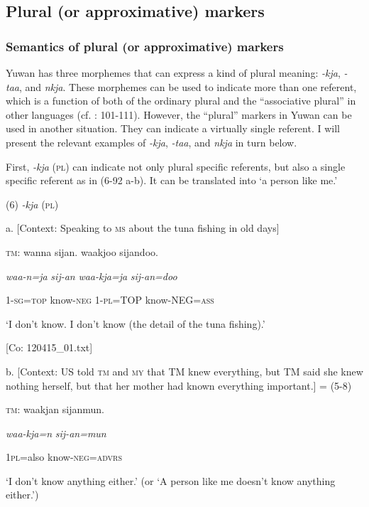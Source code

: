 \subsection{Plural (or approximative) markers}
\subsubsection{Semantics of plural (or approximative) markers}

Yuwan has three morphemes that can express a kind of plural meaning: \textit{-kja}, \textit{{}-taa}, and \textit{nkja}. These morphemes can be used to indicate more than one referent, which is a function of both of the ordinary plural and the “associative plural” in other languages (cf. \citealt{Corbett2000}: 101-111). However, the “plural” markers in Yuwan can be used in another situation. They can indicate a virtually single referent. I will present the relevant examples of \textit{{}-kja}, \textit{{}-taa}, and \textit{nkja} in turn below.

First, \textit{{}-kja} (\textsc{pl}) can indicate not only plural specific referents, but also a single specific referent as in (6-92 a-b). It can be translated into ‘a person like me.’

(6)  \textit{{}-kja} (\textsc{pl})

  a.  [Context: Speaking to \textsc{ms} about the tuna fishing in old days]

    \textsc{tm}:  wanna  sijan.  waakjoo  sijandoo.

      \textit{waa-n=ja}  \textit{sij-an}  \textit{waa-kja=ja}  \textit{sij-an=doo}

      1-\textsc{sg}=\textsc{top}  know-\textsc{neg}  1-\textsc{pl}=TOP  know-NEG=\textsc{ass}

      ‘I don’t know. I don’t know (the detail of the tuna fishing).’

      [Co: 120415\_01.txt]

  b.  [Context: US told \textsc{tm} and \textsc{my} that TM knew everything, but TM said she knew nothing herself, but that her mother had known everything important.] = (5-8)

    \textsc{tm}:  waakjan  sijanmun.

      \textit{waa-kja=n}  \textit{sij-an=mun}

      1\textsc{pl}=also  know-\textsc{neg}=\textsc{advrs}

      ‘I don’t know anything either.’ (or ‘A person like me doesn’t know anything either.’)

